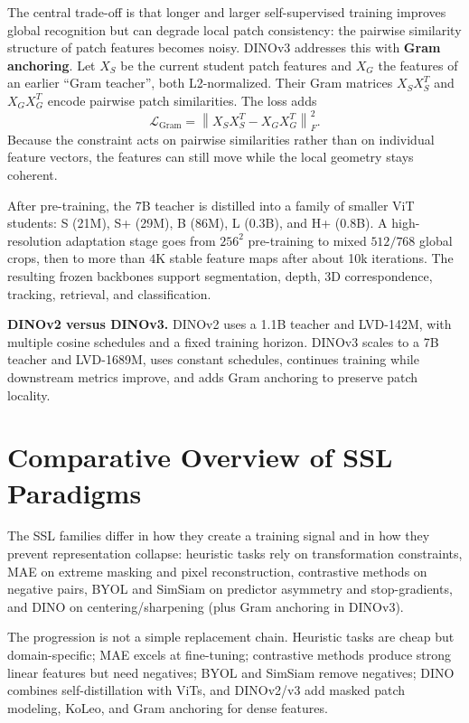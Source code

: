 The central trade-off is that longer and larger self-supervised training improves global recognition but can degrade local patch consistency: the pairwise similarity structure of patch features becomes noisy. DINOv3 addresses this with \textbf{Gram anchoring}. Let $X_S$ be the current student patch features and $X_G$ the features of an earlier ``Gram teacher'', both L2-normalized. Their Gram matrices $X_S X_S^T$ and $X_G X_G^T$ encode pairwise patch similarities. The loss adds
\begin{equation}
    \mathcal{L}_{\text{Gram}} = \left\| X_S X_S^T - X_G X_G^T \right\|_F^2.
\end{equation}
Because the constraint acts on pairwise similarities rather than on individual feature vectors, the features can still move while the local geometry stays coherent.

After pre-training, the 7B teacher is distilled into a family of smaller ViT students: S (21M), S+ (29M), B (86M), L (0.3B), and H+ (0.8B). A high-resolution adaptation stage goes from $256^2$ pre-training to mixed $512/768$ global crops, then to more than $4$K stable feature maps after about 10k iterations. The resulting frozen backbones support segmentation, depth, 3D correspondence, tracking, retrieval, and classification.

\textbf{DINOv2 versus DINOv3.} DINOv2 uses a 1.1B teacher and LVD-142M, with multiple cosine schedules and a fixed training horizon. DINOv3 scales to a 7B teacher and LVD-1689M, uses constant schedules, continues training while downstream metrics improve, and adds Gram anchoring to preserve patch locality.

\section{Comparative Overview of SSL Paradigms}

The SSL families differ in how they create a training signal and in how they prevent representation collapse: heuristic tasks rely on transformation constraints, MAE on extreme masking and pixel reconstruction, contrastive methods on negative pairs, BYOL and SimSiam on predictor asymmetry and stop-gradients, and DINO on centering/sharpening (plus Gram anchoring in DINOv3).

The progression is not a simple replacement chain. Heuristic tasks are cheap but domain-specific; MAE excels at fine-tuning; contrastive methods produce strong linear features but need negatives; BYOL and SimSiam remove negatives; DINO combines self-distillation with ViTs, and DINOv2/v3 add masked patch modeling, KoLeo, and Gram anchoring for dense features.


